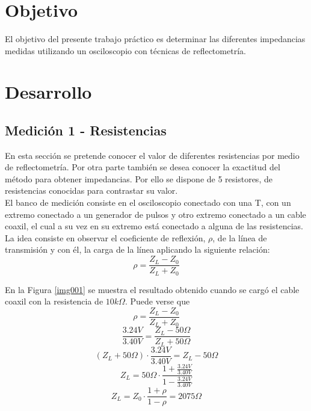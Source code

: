 \documentclass[a4paper,10pt]{article}
\title{  }
\begin{document}
	\maketitle %
	\newpage

	\tableofcontents %
	\newpage


	\section{Objetivo}
	
	\indent	El objetivo del presente trabajo práctico es determinar las 
	diferentes impedancias medidas utilizando un osciloscopio con técnicas de 
	reflectometría.
	
	\newpage
	\section{Desarrollo}

	\subsection{Medición 1 - Resistencias}
	\indent En esta sección se pretende conocer el valor de diferentes 
	resistencias por medio de reflectometr\'ia. Por otra parte tambi\'en se 
	desea conocer la exactitud del m\'etodo para obtener impedancias. Por ello
	se dispone de 5 resistores, de resistencias conocidas para contrastar su 
	valor. \\
	\indent El banco de medición consiste en el osciloscopio conectado con una
	T, con un extremo conectado a un generador de pulsos y otro extremo 
	conectado a un cable coaxil, el cual a su vez en su extremo est\'a 
	conectado a alguna de las resistencias. La idea consiste en observar el 
	coeficiente de reflexión, $\rho$, de la l\'inea de transmisión y con \'el,
	la carga de la l\'inea aplicando la siguiente relaci\'on: 
	$$\rho=\frac{Z_L-Z_0}{Z_L+Z_0}$$
	
	\indent En la Figura \ref{img001} se muestra el resultado obtenido cuando 
	se carg\'o el cable coaxil con la resistencia de $10k\Omega$. Puede verse 
	que $$\rho=\frac{Z_L-Z_0}{Z_L+Z_0}$$
	$$\frac{3.24V}{3.40V}=\frac{Z_L- 50\Omega}{Z_L+50\Omega}$$
	$$(Z_L+50\Omega) \cdot \frac{3.24V}{3.40V}=Z_L- 50\Omega$$
	$$Z_L = 50\Omega\cdot\frac{1 + \frac{3.24V}{3.40V}}{1-\frac{3.24V}{3.40V}}$$
	$$Z_L = Z_0\cdot\frac{1 + \rho}{1-\rho} = 2075\Omega$$
\end{document}

